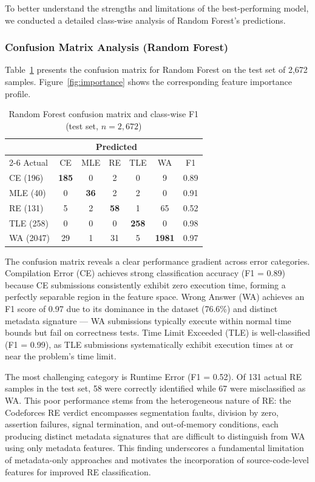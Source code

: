 \documentclass[10pt,a4paper]{article}
\begin{document}
To better understand the strengths and limitations of the best-performing
model, we conducted a detailed class-wise analysis of Random Forest's
predictions.

\subsubsection*{Confusion Matrix Analysis (Random Forest)}

Table~\ref{tab:rf-cm} presents the confusion matrix for Random Forest on the
test set of 2,672 samples. Figure~\ref{fig:importance} shows the corresponding
feature importance profile.

\begin{table}[htbp]
\centering
\caption{Random Forest confusion matrix and class-wise F1 (test set, $n=2{,}672$)}
\label{tab:rf-cm}
\begin{tabular}{@{}lccccc|c@{}}
\toprule
& \multicolumn{5}{c}{Predicted} & \\
\cmidrule{2-6}
Actual & CE & MLE & RE & TLE & WA & F1 \\
\midrule
CE (196)  & \textbf{185}  & 0   & 2   & 0   & 9   & 0.89 \\
MLE (40)  & 0   & \textbf{36}   & 2   & 2   & 0   & 0.91 \\
RE (131)  & 5   & 2   & \textbf{58} & 1   & 65  & 0.52 \\
TLE (258) & 0   & 0   & 0   & \textbf{258} & 0   & 0.98 \\
WA (2047) & 29  & 1   & 31  & 5   & \textbf{1981} & 0.97 \\
\bottomrule
\end{tabular}
\end{table}

The confusion matrix reveals a clear performance gradient across error
categories. Compilation Error (CE) achieves strong classification accuracy (F1 =
0.89) because CE submissions consistently exhibit zero execution time, forming a perfectly separable region in the
feature space. Wrong Answer (WA) achieves an F1 score of 0.97 due to
its dominance in the dataset (76.6\%) and distinct metadata signature --- WA
submissions typically execute within normal time bounds but fail on correctness tests.
Time Limit Exceeded (TLE) is well-classified (F1 = 0.99), as TLE submissions
systematically exhibit execution times at or near the problem's time limit.

The most challenging category is Runtime Error (F1 = 0.52). Of 131 actual RE samples in the test set, 58 were correctly identified while 67 were misclassified as WA. This poor performance stems from the
heterogeneous nature of RE: the Codeforces RE verdict encompasses segmentation
faults, division by zero, assertion failures, signal termination, and
out-of-memory conditions, each producing distinct metadata signatures
that are difficult to distinguish from WA using only metadata features.
This finding underscores a fundamental limitation of metadata-only approaches
and motivates the incorporation of source-code-level features for improved RE
classification.
\end{document}
